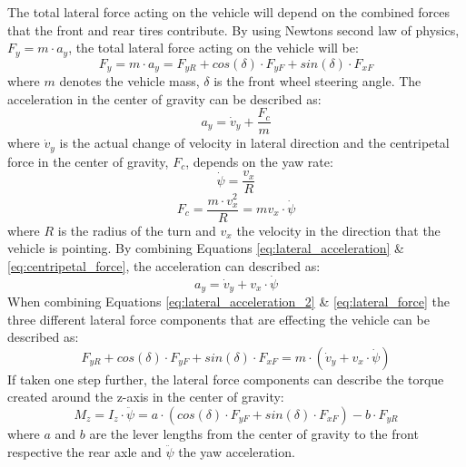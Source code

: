 The total lateral force acting on the vehicle will depend on the combined forces that the front and rear tires contribute. By using Newtons second law of physics, $ F_{y} = m\cdot a_{y} $, the total lateral force acting on the vehicle will be:
\begin{equation} \label{eq:lateral_force}
	F_{y} = m \cdot a_{y} = F_{yR} + cos(\delta) \cdot F_{yF} + sin(\delta) \cdot F_{xF} 
\end{equation}
where $ m $ denotes the vehicle mass, $ \delta $ is the front wheel steering angle. The acceleration in the center of gravity can be described as: 
\begin{equation} \label{eq:lateral_acceleration}
	a_{y} = \dot v_{y} + \dfrac{F_{c}}{m}
\end{equation}
where $ \dot v_{y} $ is the actual change of velocity in lateral direction and the centripetal force in the center of gravity, $ F_{c} $, depends on the yaw rate:
\begin{equation} \label{eq:yaw_rate}
	\dot \psi = \dfrac{v_{x}}{R}
\end{equation}
\begin{equation} \label{eq:centripetal_force}
	F_{c} = \dfrac{m \cdot v^2_{x}}{R} = mv_{x}\cdot \dot \psi
\end{equation}
where $ R $ is the radius of the turn and $ v_{x} $ the velocity in the direction that the vehicle is pointing. By combining Equations \ref{eq:lateral_acceleration} \& \ref{eq:centripetal_force}, the acceleration can described as:
\begin{equation} \label{eq:lateral_acceleration_2}
	a_{y} = \dot v_{y} + v_{x}\cdot \dot \psi
\end{equation}
When combining Equations \ref{eq:lateral_acceleration_2} \& \ref{eq:lateral_force} the three different lateral force components that are effecting the vehicle can be described as:
\begin{equation} \label{lateral_forces_2}
	F_{yR} + cos(\delta) \cdot F_{yF} + sin(\delta) \cdot F_{xF} = m\cdot (\dot v_{y} + v_{x} \cdot \dot \psi)
\end{equation}
If taken one step further, the lateral force components can describe the torque created around the z-axis in the center of gravity: 
\begin{equation} \label{yaw_bicycle}
	M_{z} = I_{z} \cdot \ddot \psi = a\cdot (cos(\delta) \cdot F_{yF} + sin(\delta) \cdot F_{xF}) - b \cdot F_{yR}
\end{equation}
where $ a $ and $ b $ are the lever lengths from the center of gravity to the front respective the rear axle and $ \ddot \psi $ the yaw acceleration. 

